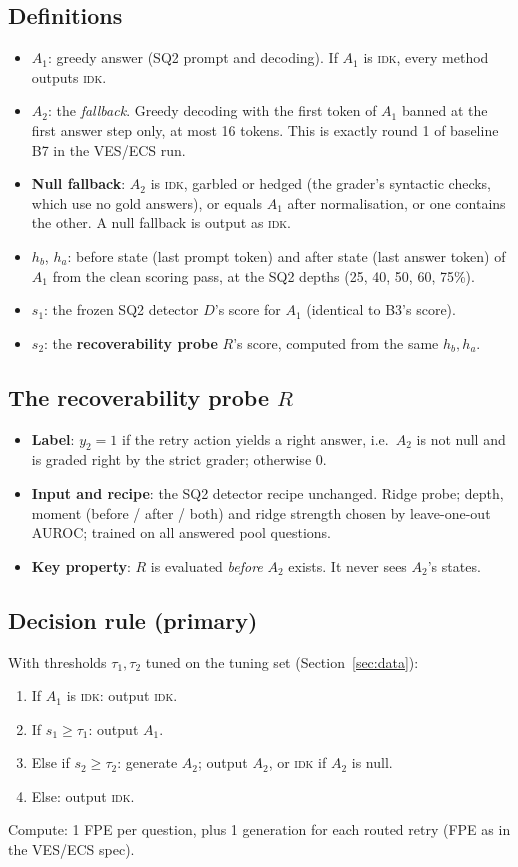 \documentclass[11pt]{article}
\newcommand{\IDK}{\textsc{idk}}
\begin{document}
\subsection{Definitions}
\begin{itemize}
  \item $A_1$: greedy answer (SQ2 prompt and decoding). If $A_1$ is \IDK, every method outputs \IDK.
  \item $A_2$: the \emph{fallback}. Greedy decoding with the first token of $A_1$ banned at the first answer step
        only, at most 16 tokens. This is exactly round 1 of baseline B7 in the VES/ECS run.
  \item \textbf{Null fallback}: $A_2$ is \IDK, garbled or hedged (the grader's syntactic checks, which use no
        gold answers), or equals $A_1$ after normalisation, or one contains the other. A null fallback is
        output as \IDK.
  \item $h_b$, $h_a$: before state (last prompt token) and after state (last answer token) of $A_1$ from the clean
        scoring pass, at the SQ2 depths (25, 40, 50, 60, 75\%).
  \item $s_1$: the frozen SQ2 detector $D$'s score for $A_1$ (identical to B3's score).
  \item $s_2$: the \textbf{recoverability probe} $R$'s score, computed from the same $h_b, h_a$.
\end{itemize}

\subsection{The recoverability probe \texorpdfstring{$R$}{R}}
\begin{itemize}
  \item \textbf{Label}: $y_2 = 1$ if the retry action yields a right answer, i.e.\ $A_2$ is not null and is graded
        right by the strict grader; otherwise 0.
  \item \textbf{Input and recipe}: the SQ2 detector recipe unchanged. Ridge probe; depth, moment
        (before / after / both) and ridge strength chosen by leave-one-out AUROC; trained on all answered pool
        questions.
  \item \textbf{Key property}: $R$ is evaluated \emph{before} $A_2$ exists. It never sees $A_2$'s states.
\end{itemize}

\subsection{Decision rule (primary)}\label{sec:rule}
With thresholds $\tau_1, \tau_2$ tuned on the tuning set (Section~\ref{sec:data}):
\begin{enumerate}
  \item If $A_1$ is \IDK: output \IDK.
  \item If $s_1 \ge \tau_1$: output $A_1$.
  \item Else if $s_2 \ge \tau_2$: generate $A_2$; output $A_2$, or \IDK{} if $A_2$ is null.
  \item Else: output \IDK.
\end{enumerate}
Compute: 1 FPE per question, plus 1 generation for each routed retry (FPE as in the VES/ECS spec).
\end{document}
